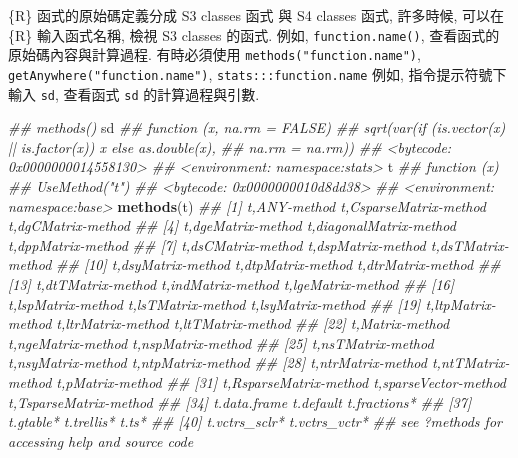\documentclass[
]{book}
\newenvironment{Shaded}{\begin{snugshade}}{\end{snugshade}}
\newcommand{\CommentTok}[1]{\textcolor[rgb]{0.56,0.35,0.01}{\textit{#1}}}
\newcommand{\KeywordTok}[1]{\textcolor[rgb]{0.13,0.29,0.53}{\textbf{#1}}}
\newcommand{\NormalTok}[1]{#1}
\begin{document}
\{R\} 函式的原始碼定義分成
S3 classes 函式 與 S4 classes 函式,
許多時候, 可以在 \{R\} 輸入函式名稱,
檢視 S3 classes 的函式.
例如,
\texttt{function.name()},
查看函式的原始碼內容與計算過程.
有時必須使用 \texttt{methods("function.name")},
\texttt{getAnywhere("function.name")},
\texttt{stats:::function.name}
例如,
指令提示符號下輸入 \texttt{sd},
查看函式 \texttt{sd} 的計算過程與引數.

\begin{Shaded}
\begin{Highlighting}[]
\CommentTok{\#\# methods()}
\NormalTok{sd}
\CommentTok{\#\# function (x, na.rm = FALSE) }
\CommentTok{\#\# sqrt(var(if (is.vector(x) || is.factor(x)) x else as.double(x), }
\CommentTok{\#\#     na.rm = na.rm))}
\CommentTok{\#\# \textless{}bytecode: 0x0000000014558130\textgreater{}}
\CommentTok{\#\# \textless{}environment: namespace:stats\textgreater{}}
\NormalTok{t}
\CommentTok{\#\# function (x) }
\CommentTok{\#\# UseMethod("t")}
\CommentTok{\#\# \textless{}bytecode: 0x0000000010d8dd38\textgreater{}}
\CommentTok{\#\# \textless{}environment: namespace:base\textgreater{}}
\KeywordTok{methods}\NormalTok{(t)}
\CommentTok{\#\#  [1] t,ANY{-}method            t,CsparseMatrix{-}method  t,dgCMatrix{-}method     }
\CommentTok{\#\#  [4] t,dgeMatrix{-}method      t,diagonalMatrix{-}method t,dppMatrix{-}method     }
\CommentTok{\#\#  [7] t,dsCMatrix{-}method      t,dspMatrix{-}method      t,dsTMatrix{-}method     }
\CommentTok{\#\# [10] t,dsyMatrix{-}method      t,dtpMatrix{-}method      t,dtrMatrix{-}method     }
\CommentTok{\#\# [13] t,dtTMatrix{-}method      t,indMatrix{-}method      t,lgeMatrix{-}method     }
\CommentTok{\#\# [16] t,lspMatrix{-}method      t,lsTMatrix{-}method      t,lsyMatrix{-}method     }
\CommentTok{\#\# [19] t,ltpMatrix{-}method      t,ltrMatrix{-}method      t,ltTMatrix{-}method     }
\CommentTok{\#\# [22] t,Matrix{-}method         t,ngeMatrix{-}method      t,nspMatrix{-}method     }
\CommentTok{\#\# [25] t,nsTMatrix{-}method      t,nsyMatrix{-}method      t,ntpMatrix{-}method     }
\CommentTok{\#\# [28] t,ntrMatrix{-}method      t,ntTMatrix{-}method      t,pMatrix{-}method       }
\CommentTok{\#\# [31] t,RsparseMatrix{-}method  t,sparseVector{-}method   t,TsparseMatrix{-}method }
\CommentTok{\#\# [34] t.data.frame            t.default               t.fractions*           }
\CommentTok{\#\# [37] t.gtable*               t.trellis*              t.ts*                  }
\CommentTok{\#\# [40] t.vctrs\_sclr*           t.vctrs\_vctr*          }
\CommentTok{\#\# see \textquotesingle{}?methods\textquotesingle{} for accessing help and source code}

\end{Highlighting}
\end{Shaded}
\end{document}
